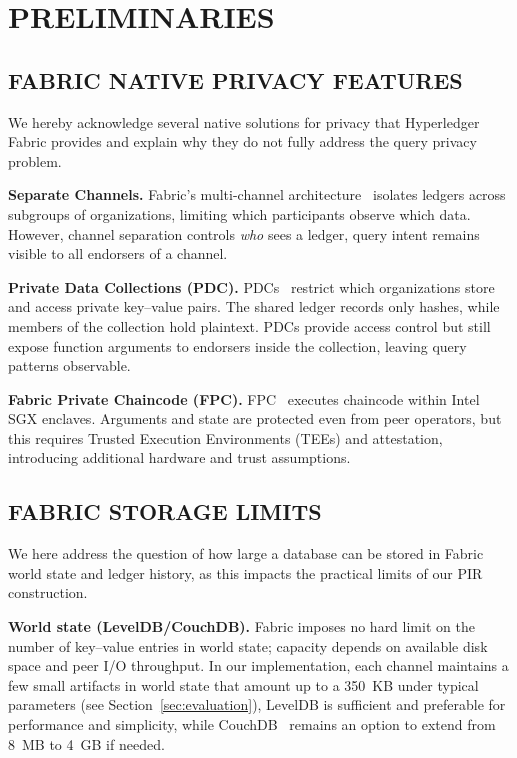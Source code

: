 \documentclass[letterpaper,journal]{IEEEtran}
\begin{document}
\section{PRELIMINARIES}\label{sec:preliminaries}

\subsection{FABRIC NATIVE PRIVACY FEATURES}
We hereby acknowledge several native solutions for privacy that Hyperledger Fabric provides and explain why they do not fully address the 
query privacy problem.

\textbf{Separate Channels.} Fabric's multi-channel architecture~\cite{fabric_docs_a_nodate} isolates ledgers across subgroups of organizations, 
limiting which participants observe which data. 
However, channel separation controls \emph{who} sees a ledger, query intent remains visible to all endorsers of a channel.

\textbf{Private Data Collections (PDC).} PDCs~\cite{fabric_docs_a_nodate} restrict which organizations store and access private key–value pairs. 
The shared ledger records only hashes, while members of the collection hold plaintext. 
PDCs provide access control but still expose function arguments to endorsers inside the collection, leaving query patterns observable.

\textbf{Fabric Private Chaincode (FPC).} FPC~\cite{fabric_docs_a_nodate, brandenburger_blockchain_2018} executes chaincode within Intel SGX enclaves. 
Arguments and state are protected even from peer operators, but this requires Trusted Execution Environments (TEEs) and attestation, 
introducing additional hardware and trust assumptions.

\subsection{FABRIC STORAGE LIMITS}
We here address the question of how large a database can be stored in Fabric world state and ledger history, as this impacts the 
practical limits of our PIR construction.

\textbf{World state (LevelDB/CouchDB).}
Fabric imposes no hard limit on the number of key–value entries in world state; capacity depends on available disk space and peer I/O throughput.
In our implementation, each channel maintains a few small artifacts in world state that amount up to a 350~KB under typical parameters (see Section~\ref{sec:evaluation}), 
LevelDB is sufficient and preferable for performance and simplicity, while CouchDB~\cite{fabric_docs_a_nodate} remains an option to extend from 8~MB to 4~GB if needed.
\end{document}
